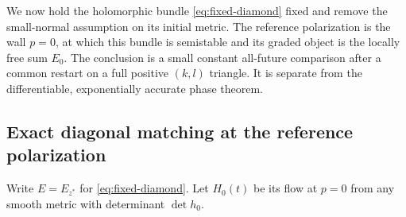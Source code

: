 \documentclass[11pt]{amsart}
\theoremstyle{definition}
\theoremstyle{remark}
\begin{document}
We now hold the holomorphic bundle \eqref{eq:fixed-diamond} fixed
and remove the small-normal assumption on its initial metric.
The reference polarization is the wall $p=0$, at which this bundle
is semistable and its graded object is the locally free sum $E_0$.
The conclusion is a small constant all-future comparison after a
common restart on a full positive $(k,l)$ triangle. It is separate
from the differentiable, exponentially accurate phase theorem.

\subsection{Exact diagonal matching at the reference polarization}
Write $E=E_{z^*}$ for \eqref{eq:fixed-diamond}. Let $H_0(t)$
be its flow at $p=0$ from any smooth metric with determinant
$\det h_0$.
\end{document}
